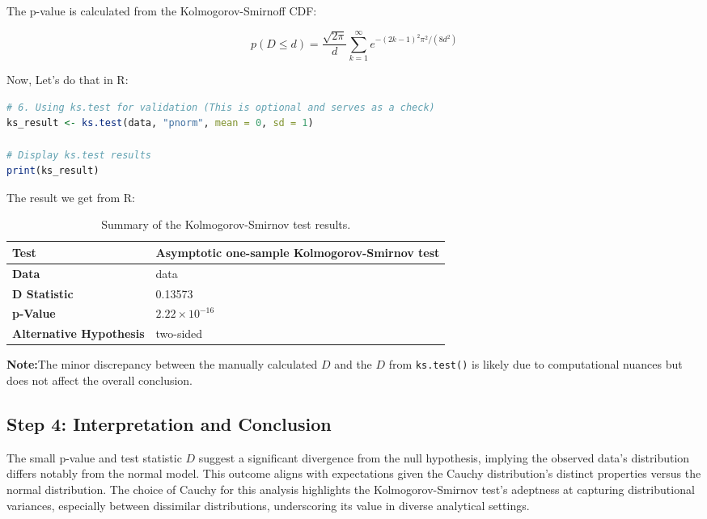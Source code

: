 \documentclass[12pt,letterpaper]{article}
\begin{document}
The p-value is calculated from the Kolmogorov-Smirnoff CDF:

\begin{equation}
p(D \leq d) = \frac{\sqrt{2\pi}}{d} \sum_{k=1}^{\infty} e^{-(2k-1)^{2}\pi^{2}/(8d^{2})}
\end{equation}

Now,  Let’s do that in R:
\begin{lstlisting}[language=R]
# 6. Using ks.test for validation (This is optional and serves as a check)
ks_result <- ks.test(data, "pnorm", mean = 0, sd = 1)

# Display ks.test results
print(ks_result)
\end{lstlisting}
The result we get from R:

\begin{table}[H] %
\centering
\begin{tabular}{ll}
\hline
\textbf{Test} & Asymptotic one-sample Kolmogorov-Smirnov test \\
\hline
\textbf{Data} & data \\
\textbf{D Statistic} & 0.13573 \\
\textbf{p-Value} & \(2.22 \times 10^{-16}\) \\
\textbf{Alternative Hypothesis} & two-sided \\
\hline
\end{tabular}
\caption{Summary of the Kolmogorov-Smirnov test results.}
\label{tab:ks_test}
\end{table}

\textbf{Note:}The minor discrepancy between the manually calculated \( D \) and the \( D \) from \texttt{ks.test()} is likely due to computational nuances but does not affect the overall conclusion.


\subsection*{Step 4: Interpretation and Conclusion}

The small p-value and test statistic \( D \)  suggest a significant divergence from the null hypothesis, implying the observed data's distribution differs notably from the normal model. This outcome aligns with expectations given the Cauchy distribution's distinct properties versus the normal distribution. The choice of Cauchy for this analysis highlights the Kolmogorov-Smirnov test's adeptness at capturing distributional variances, especially between dissimilar distributions, underscoring its value in diverse analytical settings.
\end{document}
